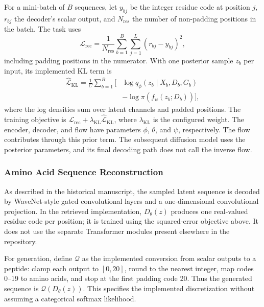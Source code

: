 \documentclass[journal]{IEEEtran}
\begin{document}
For a mini-batch of $B$ sequences, let $y_{bj}$ be the integer residue code at position $j$, $r_{bj}$ the decoder's scalar output, and $N_{\mathrm{res}}$ the number of non-padding positions in the batch. The task uses
\begin{equation}
 \mathcal{L}_{\mathrm{rec}}=\frac{1}{N_{\mathrm{res}}}\sum_{b=1}^{B}\sum_{j=1}^{L}(r_{bj}-y_{bj})^2,
\end{equation}
including padding positions in the numerator. With one posterior sample $z_b$ per input, its implemented KL term is
\begin{equation}
\begin{aligned}
 \widehat{\mathcal{L}}_{\mathrm{KL}}=\frac{1}{C}\sum_{b=1}^{B}\bigl[&\log q_\phi(z_b\mid X_b,D_b,G_b)\\
 &-\log\pi(f_\psi(z_b;D_b))\bigr],
\end{aligned}
\end{equation}
where the log densities sum over latent channels and padded positions. The training objective is $\mathcal{L}_{\mathrm{rec}}+\lambda_{\mathrm{KL}}\widehat{\mathcal{L}}_{\mathrm{KL}}$, where $\lambda_{\mathrm{KL}}$ is the configured weight. The encoder, decoder, and flow have parameters $\phi$, $\theta$, and $\psi$, respectively. The flow contributes through this prior term. The subsequent diffusion model uses the posterior parameters, and its final decoding path does not call the inverse flow.

\subsubsection{Amino Acid Sequence Reconstruction}

As described in the historical manuscript, the sampled latent sequence is decoded by WaveNet-style gated convolutional layers and a one-dimensional convolutional projection. In the retrieved implementation, $D_\theta(z)$ produces one real-valued residue code per position; it is trained using the squared-error objective above. It does not use the separate Transformer modules present elsewhere in the repository.

For generation, define $\mathcal{Q}$ as the implemented conversion from scalar outputs to a peptide: clamp each output to $[0,20]$, round to the nearest integer, map codes 0--19 to amino acids, and stop at the first padding code 20. Thus the generated sequence is $\mathcal{Q}(D_\theta(z))$. This specifies the implemented discretization without assuming a categorical softmax likelihood.
\end{document}

